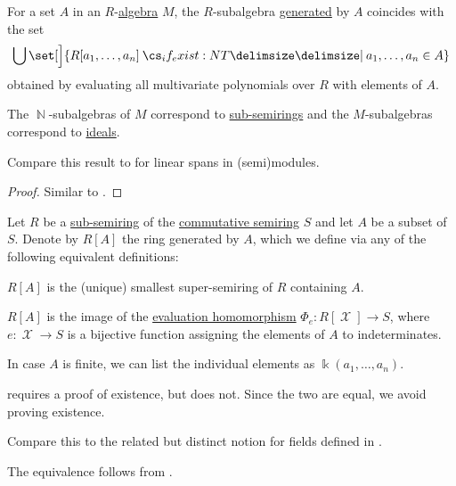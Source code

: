 \begin{proposition}\label{thm:generators_via_polynomials}
  For a set \( A \) in an \( R \)-\hyperref[def:algebra_over_semiring]{algebra} \( M \), the \( R \)-subalgebra \hyperref[def:algebra_over_semiring/generated]{generated} by \( A \) coincides with the set
  \begin{equation*}
    \bigcup \set[\Big]{ R[a_1, \ldots, a_n] \given* a_1, \ldots, a_n \in A }
  \end{equation*}
  obtained by evaluating all multivariate polynomials over \( R \) with elements of \( A \).
\end{proposition}
\begin{comments}
  \item The \( \BbbN \)-subalgebras of \( M \) correspond to \hyperref[def:semiring/submodel]{sub-semirings} and the \( M \)-subalgebras correspond to \hyperref[def:semiring_ideal]{ideals}.

  \item Compare this result to  for linear spans in (semi)modules.
\end{comments}
\begin{proof}
  Similar to .
\end{proof}

\begin{definition}\label{def:semiring_adjunction}
  Let \( R \) be a \hyperref[def:ring/submodel]{sub-semiring} of the \hyperref[def:semiring/commutative]{commutative semiring} \( S \) and let \( A \) be a subset of \( S \). Denote by \( R[A] \) the ring generated by  \( A \), which we define via any of the following equivalent definitions:
  \begin{thmenum}
     \( R[A] \) is the (unique) smallest super-semiring of \( R \) containing \( A \).

     \( R[A] \) is the image of the \hyperref[rem:substitution_homomorphism]{evaluation homomorphism} \( \Phi_e: R[\mscrX] \to S \), where \( e: \mscrX \to S \) is a bijective function assigning the elements of \( A \) to indeterminates.
  \end{thmenum}

  In case \( A \) is finite, we can list the individual elements as \( \Bbbk(a_1, \ldots, a_n) \).
\end{definition}
\begin{comments}
  \item {} requires a proof of existence, but  does not. Since the two are equal, we avoid proving existence.
  \item Compare this to the related but distinct notion for fields defined in .
\end{comments}
\begin{defproof}
  The equivalence follows from .
\end{defproof}

